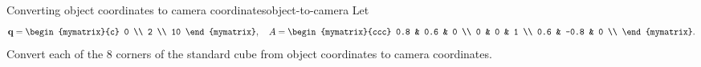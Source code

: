 \begin{example}{Converting object coordinates to camera coordinates}{object-to-camera}
  Let
  \begin{equation*}
    \vect{q} = \begin{mymatrix}{c} 0 \\ 2 \\ 10 \end{mymatrix},\quad
    A = \begin{mymatrix}{ccc}
      0.8 & 0.6 & 0 \\
      0 & 0 & 1 \\
      0.6 & -0.8 & 0 \\
    \end{mymatrix}.
  \end{equation*}
  Convert each of the 8 corners of the standard cube from object
  coordinates to camera coordinates.
\end{example}

